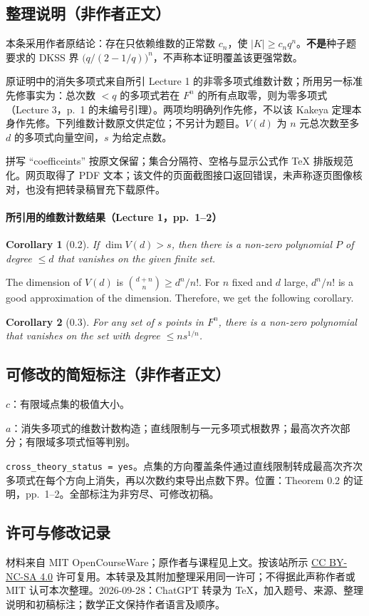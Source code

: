 \documentclass[UTF8,11pt]{ctexart}
\newtheorem*{corollary}{Corollary}
\begin{document}
\subsection*{整理说明（非作者正文）}
本条采用作者原结论：存在只依赖维数的正常数 $c_n$，使 $|K|\geq c_nq^n$。\textbf{不是}种子题要求的 DKSS 界 $\bigl(q/(2-1/q)\bigr)^n$，不声称本证明覆盖该更强常数。

原证明中的消失多项式来自所引 Lecture 1 的非零多项式维数计数；所用另一标准先修事实为：总次数 $<q$ 的多项式若在 $F^n$ 的所有点取零，则为零多项式（Lecture 3，p.~1 的未编号引理）。两项均明确列作先修，不以该 Kakeya 定理本身作先修。下列维数计数原文供定位；不另计为题目。$V(d)$ 为 $n$ 元总次数至多 $d$ 的多项式向量空间，$s$ 为给定点数。

拼写 ``coefficeints'' 按原文保留；集合分隔符、空格与显示公式作 TeX 排版规范化。网页取得了 PDF 文本；该文件的页面截图接口返回错误，未声称逐页图像核对，也没有把转录稿冒充下载原件。

\paragraph{所引用的维数计数结果（Lecture 1，pp.~1--2）}
\begin{corollary}[0.2]
If $\dim V(d)>s$, then there is a non-zero polynomial $P$ of degree $\leq d$ that vanishes on the given finite set.
\end{corollary}
The dimension of $V(d)$ is $\binom{d+n}{n}\geq d^n/n!$. For $n$ fixed and $d$ large, $d^n/n!$ is a good approximation of the dimension. Therefore, we get the following corollary.
\begin{corollary}[0.3]
For any set of $s$ points in $F^n$, there is a non-zero polynomial that vanishes on the set with degree $\leq ns^{1/n}$.
\end{corollary}


\subsection*{可修改的简短标注（非作者正文）}
$c$：有限域点集的极值大小。

$a$：消失多项式的维数计数构造；直线限制与一元多项式根数界；最高次齐次部分；有限域多项式恒等判别。

\texttt{cross\_theory\_status = yes}。点集的方向覆盖条件通过直线限制转成最高次齐次多项式在每个方向上消失，再以次数约束导出点数下界。位置：Theorem 0.2 的证明，pp.~1--2。全部标注为非穷尽、可修改初稿。
\subsection*{许可与修改记录}
材料来自 MIT OpenCourseWare；原作者与课程见上文。按该站所示 \href{https://creativecommons.org/licenses/by-nc-sa/4.0/}{CC BY-NC-SA 4.0} 许可复用。本转录及其附加整理采用同一许可；不得据此声称作者或 MIT 认可本次整理。2026-09-28：ChatGPT 转录为 TeX，加入题号、来源、整理说明和初稿标注；数学正文保持作者语言及顺序。
\end{document}
